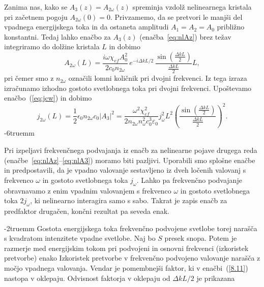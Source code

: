 Zanima nas, kako se $A_{3}(z) = A_{2\omega}(z)$ spreminja vzdolž nelinearnega kristala
pri začetnem pogoju $A_{2\omega}(0)=0$.
Privzamemo, da se pretvori le manjši del vpadnega energijskega toka in da ostaneta 
amplitudi $A_{1}=A_{2}=A_0$ približno konstantni. Tedaj lahko
enačbo za $A_{3}(z)$ (enačba~\ref{eq:nlAz}) brez težav integriramo do dolžine kristala $L$ in 
dobimo
\begin{equation}
A_{2\omega}(L)=\frac{i\omega \chi_{ef} A_0^2}{2c_0 n_{2\omega}}
\,e^{-i\Delta kL/2}\, \frac{\sin\left(\frac{\Delta k L}{2}\right)}{\frac{\Delta kL}{2}}L,
\label{8.9}
\end{equation}
pri čemer smo z $n_{2\omega}$ označili lomni količnik pri dvojni frekvenci.
Iz tega izraza izračunamo izhodno gostoto svetlobnega toka pri dvojni
frekvenci. Upoštevamo enačbo~(\ref{eq:jcw}) in dobimo
\begin{equation}
j_{2\omega}(L) =\frac{1}{2}\epsilon_{0}n_{2\omega}c_0|A_3|^2 = 
\frac{\omega^2 \chi_{ef}^2}{2 n_{2\omega} n_\omega^2c_0^3\varepsilon_0} j_\omega^2 L^2
\left(\frac{\sin\left(\frac{\Delta k L}{2}\right)}{\frac{\Delta kL}{2}}\right)^2.
\label{8.10}
\end{equation}
\vglue-6truemm
\begin{remark}
Pri izpeljavi frekvenčnega podvajanja iz enačb za nelinearne pojave drugega
reda (enačbe~\ref{eq:nlAz}--\ref{eq:nlA3}) moramo biti pazljivi. 
Uporabili smo splošne enačbe in predpostavili, da je 
vpadno valovanje se\-stav\-lje\-no iz dveh ločenih valovanj s frekvenco $\omega$
in gostoto svetlobnega toka $j_\omega$. Lahko pa frekvenčno podvajanje obravnavamo
z enim vpadnim valovanjem s frekvenco $\omega$ in gostoto svetlobnega toka $2j_\omega$, 
ki nelinearno interagira samo s sabo. Takrat je zapis enačb za predfaktor
drugačen, končni rezultat pa seveda enak. 
\end{remark}
\vglue-2truemm
Gostota energijskega toka frekvenčno podvojene svetlobe torej narašča s kvadratom
intenzitete vpadne svetlobe. Naj bo $S$ presek snopa. Potem je razmerje med 
energijskim tokom pri podvojeni in osnovni frekvenci (izkoristek pretvorbe) enako
Izkoristek pretvorbe v frekvenčno podvojeno valovanje narašča z močjo vpadnega valovanja.
Vendar je pomembnejši faktor, ki v enačbi~(\ref{8.11}) nastopa v oklepaju.
Odvisnost faktorja v oklepaju od $\Delta kL/2$ je prikazana 
